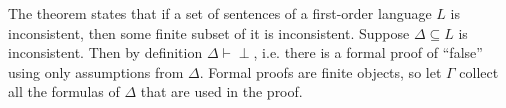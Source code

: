 \documentclass[12pt]{article}
\newcommand{\proves}{\vdash}
\begin{document}
The theorem states that if a set of sentences of a first-order language $L$ is inconsistent, then some finite subset of it is inconsistent.  Suppose $\Delta\subseteq L$ is inconsistent.  Then by definition $\Delta\proves\perp$, i.e. there is a formal proof of ``false'' using only assumptions from $\Delta$.  Formal proofs are finite objects, so let $\Gamma$ collect all the formulas of $\Delta$ that are used in the proof.
\end{document}
